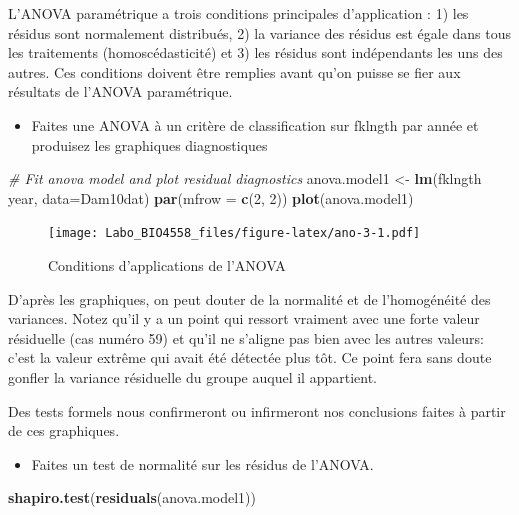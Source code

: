 \documentclass[12pt,]{book}
\newenvironment{Shaded}{\begin{snugshade}}{\end{snugshade}}
\newcommand{\CommentTok}[1]{\textcolor[rgb]{0.37,0.37,0.37}{\textit{#1}}}
\newcommand{\DataTypeTok}[1]{\textcolor[rgb]{0.27,0.27,0.27}{#1}}
\newcommand{\DecValTok}[1]{\textcolor[rgb]{0.06,0.06,0.06}{#1}}
\newcommand{\KeywordTok}[1]{\textcolor[rgb]{0.27,0.27,0.27}{\textbf{#1}}}
\newcommand{\NormalTok}[1]{#1}
\newcommand{\OperatorTok}[1]{\textcolor[rgb]{0.43,0.43,0.43}{\textbf{#1}}}
\newcommand{\StringTok}[1]{\textcolor[rgb]{0.5,0.5,0.5}{#1}}
\providecommand{\tightlist}{%
  \setlength{\itemsep}{0pt}\setlength{\parskip}{0pt}}
\begin{document}
L'ANOVA paramétrique a trois conditions principales d'application : 1) les résidus sont normalement distribués, 2) la variance des résidus est égale dans tous les traitements (homoscédasticité) et 3) les résidus sont indépendants les uns des autres. Ces conditions doivent être remplies avant qu'on puisse se fier aux résultats de l'ANOVA paramétrique.

\begin{itemize}
\tightlist
\item
  Faites une ANOVA à un critère de classification sur fklngth par année et produisez les graphiques diagnostiques
\end{itemize}

\begin{Shaded}
\begin{Highlighting}[]
\CommentTok{# Fit anova model and plot residual diagnostics}
\NormalTok{anova.model1 <-}\StringTok{ }\KeywordTok{lm}\NormalTok{(fklngth }\OperatorTok{~}\StringTok{ }\NormalTok{year, }\DataTypeTok{data=}\NormalTok{Dam10dat)}
\KeywordTok{par}\NormalTok{(}\DataTypeTok{mfrow =} \KeywordTok{c}\NormalTok{(}\DecValTok{2}\NormalTok{, }\DecValTok{2}\NormalTok{))}
\KeywordTok{plot}\NormalTok{(anova.model1)}
\end{Highlighting}
\end{Shaded}

\begin{figure}
\centering
\texttt{[image: Labo\_BIO4558\_files/figure-latex/ano-3-1.pdf]}
\caption{\label{fig:ano-3}Conditions d'applications de l'ANOVA}
\end{figure}

D'après les graphiques, on peut douter de la normalité et de l'homogénéité des variances. Notez qu'il y a un point qui ressort vraiment avec une forte valeur résiduelle (cas numéro 59) et qu'il ne s'aligne pas bien avec les autres valeurs: c'est la valeur extrême qui avait été détectée plus tôt. Ce point fera sans doute gonfler la variance résiduelle du groupe auquel il appartient.

Des tests formels nous confirmeront ou infirmeront nos conclusions faites à partir de ces graphiques.

\begin{itemize}
\tightlist
\item
  Faites un test de normalité sur les résidus de l'ANOVA.
\end{itemize}

\begin{Shaded}
\begin{Highlighting}[]
\KeywordTok{shapiro.test}\NormalTok{(}\KeywordTok{residuals}\NormalTok{(anova.model1))}
\end{Highlighting}
\end{Shaded}
\end{document}

